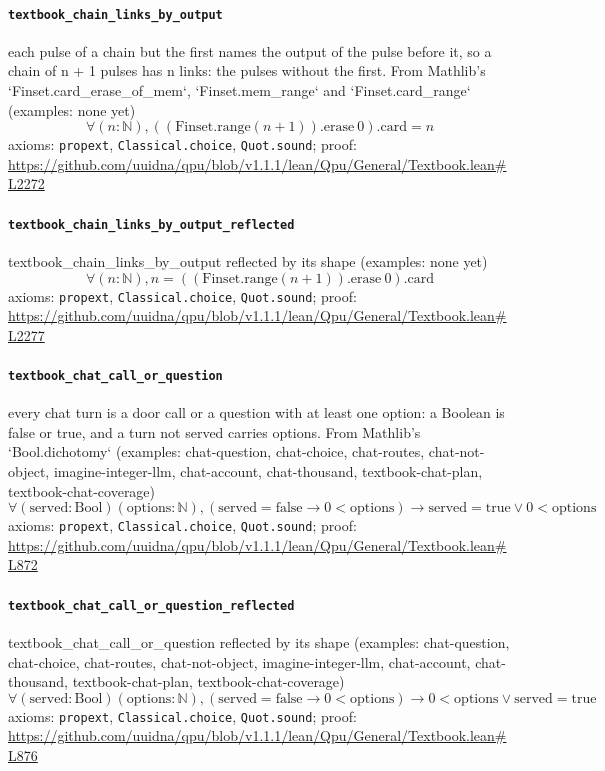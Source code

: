\documentclass[11pt]{article}
\begin{document}
\paragraph{\texttt{textbook\_chain\_links\_by\_output}}
each pulse of a chain but the first names the output of the pulse before it, so a chain of n + 1 pulses has n links: the pulses without the first. From Mathlib's `Finset.card\_erase\_of\_mem`, `Finset.mem\_range` and `Finset.card\_range` (examples: none yet)
\[ \forall (n : \mathbb{N}), ((\mathrm{Finset.range} (n + 1))\mathrm{.erase}\ 0)\mathrm{.card} = n \]
\noindent axioms: \texttt{propext}, \texttt{Classical.choice}, \texttt{Quot.sound}; proof: \url{https://github.com/uuidna/qpu/blob/v1.1.1/lean/Qpu/General/Textbook.lean\#L2272}

\paragraph{\texttt{textbook\_chain\_links\_by\_output\_reflected}}
textbook\_chain\_links\_by\_output reflected by its shape (examples: none yet)
\[ \forall (n : \mathbb{N}), n = ((\mathrm{Finset.range} (n + 1))\mathrm{.erase}\ 0)\mathrm{.card} \]
\noindent axioms: \texttt{propext}, \texttt{Classical.choice}, \texttt{Quot.sound}; proof: \url{https://github.com/uuidna/qpu/blob/v1.1.1/lean/Qpu/General/Textbook.lean\#L2277}

\paragraph{\texttt{textbook\_chat\_call\_or\_question}}
every chat turn is a door call or a question with at least one option: a Boolean is false or true, and a turn not served carries options. From Mathlib's `Bool.dichotomy` (examples: chat-question, chat-choice, chat-routes, chat-not-object, imagine-integer-llm, chat-account, chat-thousand, textbook-chat-plan, textbook-chat-coverage)
\[ \forall (\mathrm{served} : \mathrm{Bool}) (\mathrm{options} : \mathbb{N}), (\mathrm{served} = \mathrm{false} \to 0 < \mathrm{options}) \to \mathrm{served} = \mathrm{true} \lor 0 < \mathrm{options} \]
\noindent axioms: \texttt{propext}, \texttt{Classical.choice}, \texttt{Quot.sound}; proof: \url{https://github.com/uuidna/qpu/blob/v1.1.1/lean/Qpu/General/Textbook.lean\#L872}

\paragraph{\texttt{textbook\_chat\_call\_or\_question\_reflected}}
textbook\_chat\_call\_or\_question reflected by its shape (examples: chat-question, chat-choice, chat-routes, chat-not-object, imagine-integer-llm, chat-account, chat-thousand, textbook-chat-plan, textbook-chat-coverage)
\[ \forall (\mathrm{served} : \mathrm{Bool}) (\mathrm{options} : \mathbb{N}), (\mathrm{served} = \mathrm{false} \to 0 < \mathrm{options}) \to 0 < \mathrm{options} \lor \mathrm{served} = \mathrm{true} \]
\noindent axioms: \texttt{propext}, \texttt{Classical.choice}, \texttt{Quot.sound}; proof: \url{https://github.com/uuidna/qpu/blob/v1.1.1/lean/Qpu/General/Textbook.lean\#L876}
\end{document}
